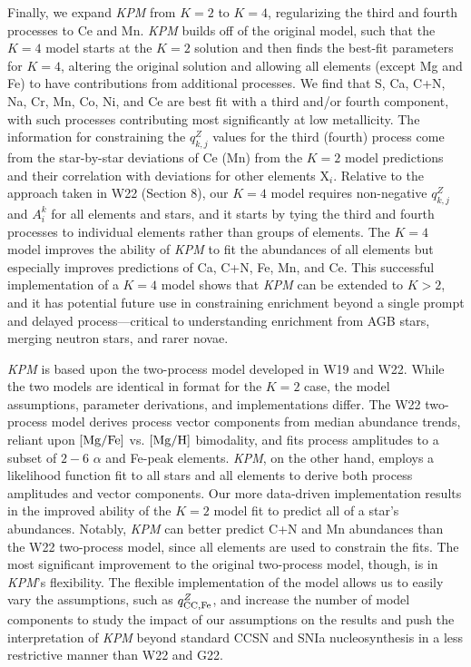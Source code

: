 \documentclass[modern]{aastex631}
\newcommand{\mgfe}[0]{[{\rm Mg/Fe}]}
\newcommand{\mgh}{[{\rm Mg}/{\rm H}]}
\newcommand{\qccFe}{q_{{\rm CC, Fe}}^{Z}}
\newcommand{\name}{\textsl{KPM}}
\begin{document}
Finally, we expand \name{} from $K=2$ to $K=4$, regularizing the third and fourth processes to Ce and Mn. \name{} builds off of the original model, such that the $K=4$ model starts at the $K=2$ solution and then finds the best-fit parameters for $K=4$, altering the original solution and allowing all elements (except Mg and Fe) to have contributions from additional processes. We find that S, Ca, C+N, Na, Cr, Mn, Co, Ni, and Ce are best fit with a third and/or fourth component, with such processes contributing most significantly at low metallicity. 
The information for constraining the $q^{Z}_{k,j}$ values for the third (fourth) process come from the star-by-star deviations of Ce (Mn) from the $K=2$ model predictions and their correlation with deviations for other elements $\text{X}_i$. Relative to the approach taken in W22 (Section 8), our $K=4$ model requires non-negative $q^Z_{k,j}$ and $A_i^k$ for all elements and stars, and it starts by tying the third and fourth processes to individual elements rather than groups of elements.
The $K=4$ model improves the ability of \name{} to fit the abundances of all elements but especially improves predictions of Ca, C+N, Fe, Mn, and Ce. This successful implementation of a $K=4$ model shows that \name{} can be extended to $K>2$, and it has potential future use in constraining enrichment beyond a single prompt and delayed process---critical to understanding enrichment from AGB stars, merging neutron stars, and rarer novae. 

\name{} is based upon the two-process model developed in W19 and W22. While the two models are identical in format for the $K=2$ case, the model assumptions, parameter derivations, and implementations differ. The W22 two-process model derives process vector components from median abundance trends, reliant upon $\mgfe$ vs. $\mgh$ bimodality, and fits process amplitudes to a subset of $2-6$ $\alpha$ and Fe-peak elements. \name{}, on the other hand, employs a likelihood function fit to all stars and all elements to derive both process amplitudes and vector components. Our more data-driven implementation results in the improved ability of the $K=2$ model fit to predict all of a star's abundances. Notably, \name{} can better predict C+N and Mn abundances than the W22 two-process model, since all elements are used to constrain the fits. The most significant improvement to the original two-process model, though, is in \name{}'s flexibility. The flexible implementation of the model allows us to easily vary the assumptions, such as $\qccFe$, and increase the number of model components to study the impact of our assumptions on the results and push the interpretation of \name{} beyond standard CCSN and SNIa nucleosynthesis in a less restrictive manner than W22 and G22. 
\end{document}
